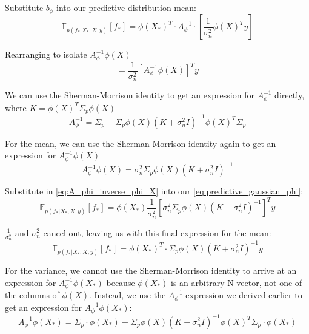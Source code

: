 \documentclass[10pt]{article}
\begin{document}
Substitute $b_{\phi}$ into our predictive distribution mean:
\begin{equation*}
    \mathbb{E}_{p(f_*|X_*,X,y)}[f_*] = \phi(X_*)^T \cdot A_\phi^{-1} \cdot \left[\frac{1}{\sigma_n^2}\phi(X)^Ty\right]
\end{equation*}

Rearranging to isolate $A_\phi^{-1}\phi(X)$
\begin{equation*}
    = \frac{1}{\sigma_n^2}\left[A_{\phi}^{-1}\phi(X)\right]^Ty
\end{equation*}

We can use the Sherman-Morrison identity to get an expression for $A_{\phi}^{-1}$ directly, where $K =\phi(X)^T\Sigma_p\phi(X)$
\begin{equation*}
    A_{\phi}^{-1} = \Sigma_p - \Sigma_p\phi(X)(K+\sigma_n^2I)^{-1}\phi(X)^T\Sigma_p
\end{equation*}

For the mean, we can use the Sherman-Morrison identity again to get an expression for $A_{\phi}^{-1}\phi(X)$
\begin{equation} \label{eq:A_phi_inverse_phi_X}
    A_{\phi}^{-1}\phi(X) = \sigma_n^2\Sigma_p\phi(X)(K+\sigma_n^2I)^{-1}
\end{equation}

Substitute in \ref{eq:A_phi_inverse_phi_X} into our \ref{eq:predictive_gaussian_phi}:
\begin{equation*}
    \mathbb{E}_{p(f_*|X_*,X,y)}[f_*] = \phi(X_*) \frac{1}{\sigma_n^2}\left[\sigma_n^2\Sigma_p\phi(X)(K+\sigma_n^2I)^{-1}\right]^Ty
\end{equation*}

$\frac{1}{\sigma_n^2}$ and $\sigma_n^2$ cancel out, leaving us with this final expression for the mean:
\begin{equation} \label{eq:alt_predictive_mean_phi}
    \mathbb{E}_{p(f_*|X_*,X,y)}[f_*] = \phi(X_*)^T \cdot \Sigma_p\phi(X)(K+\sigma_n^2I)^{-1}y
\end{equation}

For the variance, we cannot use the Sherman-Morrison identity to arrive at an expression for $A_{\phi}^{-1}\phi(X_*)$ because $\phi(X_*)$ is an arbitrary N-vector, not one of the columns of $\phi(X)$. Instead, we use the $A_{\phi}^{-1}$ expression we derived earlier to get an expression for $A_{\phi}^{-1}\phi(X_*)$:
\begin{equation*}
    A_{\phi}^{-1}\phi(X_*) = \Sigma_p \cdot \phi(X_*) - \Sigma_p\phi(X)(K+\sigma_n^2I)^{-1}\phi(X)^T\Sigma_p \cdot \phi(X_*)
\end{equation*}
\end{document}
